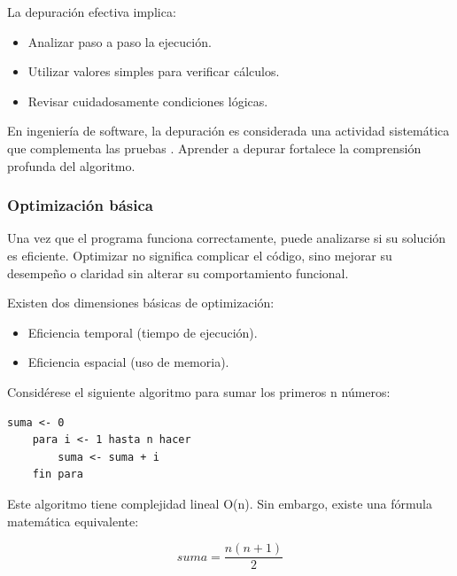 \documentclass[12pt,twoside]{book}
\begin{document}
						\noindent
						La depuración efectiva implica:
						
						\begin{itemize}
							\item Analizar paso a paso la ejecución.
							\item Utilizar valores simples para verificar cálculos.
							\item Revisar cuidadosamente condiciones lógicas.
						\end{itemize}
						
						\noindent
						En ingeniería de software, la depuración es considerada una actividad sistemática que complementa las pruebas \cite{McConnell2004Code}. Aprender a depurar fortalece la comprensión profunda del algoritmo.
						
					\subsubsection{Optimización básica}
						\noindent
						Una vez que el programa funciona correctamente, puede analizarse si su solución es eficiente. Optimizar no significa complicar el código, sino mejorar su desempeño o claridad sin alterar su comportamiento funcional.
						
						Existen dos dimensiones básicas de optimización:
						
						\begin{itemize}
							\item Eficiencia temporal (tiempo de ejecución).
							\item Eficiencia espacial (uso de memoria).
						\end{itemize}
						
						\noindent
						Considérese el siguiente algoritmo para sumar los primeros n números:
						
						\begin{lstlisting}[style=upsamStyle, caption={Suma iterativa de los primeros n números.},
							label={lst:SumaIterativa}, basicstyle=\small\ttfamily]
	suma <- 0
	para i <- 1 hasta n hacer
		suma <- suma + i
	fin para \end{lstlisting}
						
						\noindent
						Este algoritmo tiene complejidad lineal O(n). Sin embargo, existe una fórmula matemática equivalente:
						
						\[
						suma = \frac{n(n+1)}{2}
						\]
						
\end{document}
